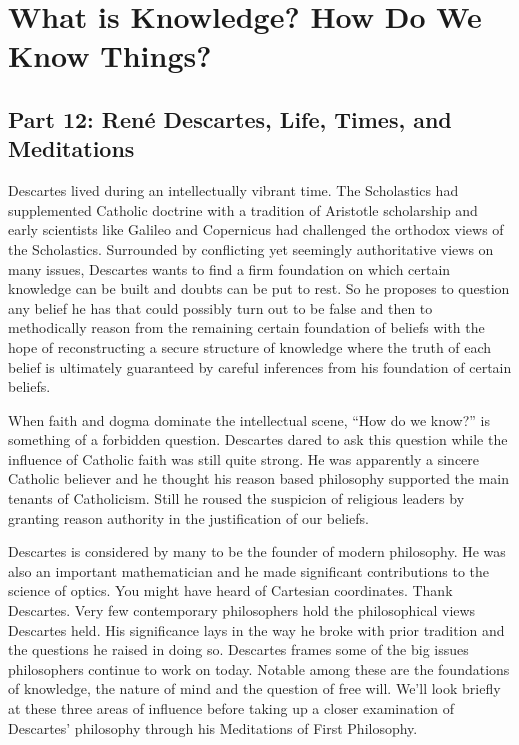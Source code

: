 \part{What is Knowledge? How Do We Know Things?}
\label{ch.modsix}

\chapter{Part 12: Ren\'e Descartes, Life, Times, and Meditations}
Descartes lived during an intellectually vibrant time. The Scholastics had supplemented Catholic doctrine with a tradition of Aristotle scholarship and early scientists like Galileo and Copernicus had challenged the orthodox views of the Scholastics. Surrounded by conflicting yet seemingly authoritative views on many issues, Descartes wants to find a firm foundation on which certain knowledge can be built and doubts can be put to rest. So he proposes to question any belief he has that could possibly turn out to be false and then to methodically reason from the remaining certain foundation of beliefs with the hope of reconstructing a secure structure of knowledge where the truth of each belief is ultimately guaranteed by careful inferences from his foundation of certain beliefs.

When faith and dogma dominate the intellectual scene, “How do we know?” is something of a forbidden question. Descartes dared to ask this question while the influence of Catholic faith was still quite strong. He was apparently a sincere Catholic believer and he thought his reason based philosophy supported the main tenants of Catholicism. Still he roused the suspicion of religious leaders by granting reason authority in the justification of our beliefs.

Descartes is considered by many to be the founder of modern philosophy. He was also an important mathematician and he made significant contributions to the science of optics. You might have heard of Cartesian coordinates. Thank Descartes. Very few contemporary philosophers hold the philosophical views Descartes held. His significance lays in the way he broke with prior tradition and the questions he raised in doing so. Descartes frames some of the big issues philosophers continue to work on today. Notable among these are the foundations of knowledge, the nature of mind and the question of free will. We’ll look briefly at these three areas of influence before taking up a closer examination of Descartes’ philosophy through his Meditations of First Philosophy.\autocite{Descartes1}

